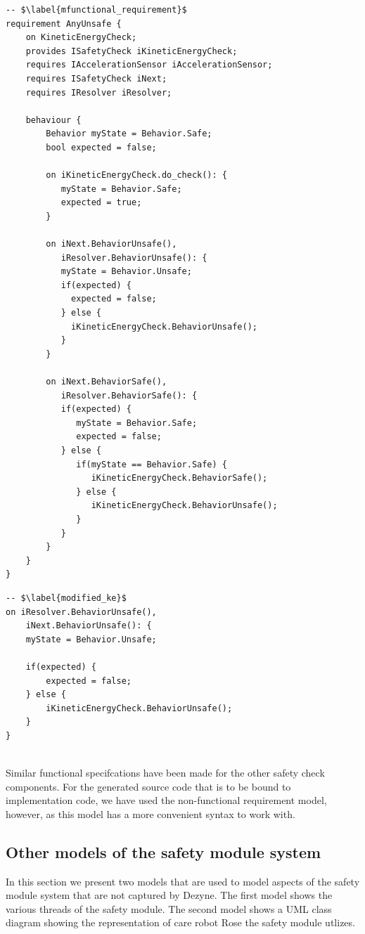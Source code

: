 \documentclass[12pt]{scrreprt}
\begin{document}
\begin{verbatim}
-- $\label{mfunctional_requirement}$
requirement AnyUnsafe {
	on KineticEnergyCheck;
	provides ISafetyCheck iKineticEnergyCheck;
	requires IAccelerationSensor iAccelerationSensor;
	requires ISafetyCheck iNext;
	requires IResolver iResolver;

	behaviour {
		Behavior myState = Behavior.Safe;
		bool expected = false;

		on iKineticEnergyCheck.do_check(): {
		   myState = Behavior.Safe;
		   expected = true;
		}

		on iNext.BehaviorUnsafe(),
		   iResolver.BehaviorUnsafe(): {
		   myState = Behavior.Unsafe;
		   if(expected) {
		   	 expected = false;
		   } else {
		     iKineticEnergyCheck.BehaviorUnsafe();
		   }
		}

		on iNext.BehaviorSafe(),
		   iResolver.BehaviorSafe(): {
		   if(expected) {
		   	  myState = Behavior.Safe;
			  expected = false;
		   } else {
		   	  if(myState == Behavior.Safe) {
			     iKineticEnergyCheck.BehaviorSafe();
			  } else {
			  	 iKineticEnergyCheck.BehaviorUnsafe();
			  }
		   }
		}
	}
}
\end{verbatim} 

\begin{verbatim}
-- $\label{modified_ke}$
on iResolver.BehaviorUnsafe(),
	iNext.BehaviorUnsafe(): {
	myState = Behavior.Unsafe;

	if(expected) {
	    expected = false;
	} else {
    	iKineticEnergyCheck.BehaviorUnsafe();
	}
}
 
\end{verbatim}

Similar functional specifcations have been made for the other safety check components. For the generated source code that is to be bound to implementation code, we have used the non-functional requirement model, however, as this model has a more convenient syntax to work with.

\subsection{Other models of the safety module system}
In this section we present two models that are used to model aspects of the safety module system that are not captured by Dezyne. The first model shows the various threads of the safety module. The second model shows a UML class diagram showing the representation of care robot Rose the safety module utlizes.
\end{document}
